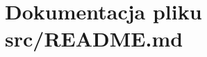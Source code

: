 \hypertarget{_r_e_a_d_m_e_8md}{}\section{Dokumentacja pliku src/\+R\+E\+A\+D\+M\+E.md}
\label{_r_e_a_d_m_e_8md}
